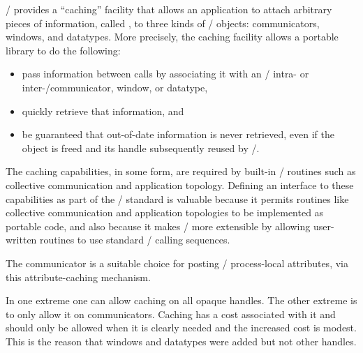 \MPI/ provides a ``caching'' facility that allows an application to
attach arbitrary pieces of information, called , to
three kinds of \MPI/ objects: communicators,
windows, and datatypes.
More precisely, the caching
facility allows a portable library to do the following:
\begin{itemize}
\item
  pass information between calls by associating it
  with an \MPI/ intra- or inter\hyphen/communicator,
window, or datatype,
\item quickly retrieve that information, and
\item
 be guaranteed that out-of-date information is never retrieved, even if
 the object is freed and its handle subsequently reused by \MPI/.
\end{itemize}

The caching capabilities, in some form, are required by built-in \MPI/ routines
such as collective communication and application topology. Defining an
interface to these capabilities as part of the \MPI/ standard is valuable
because it permits routines like collective communication and application
topologies to be implemented as portable code, and also because it makes \MPI/
more extensible by allowing user-written routines to use standard \MPI/ calling
sequences.

\begin{users}
The communicator  is a suitable choice for posting
\MPI/ process-local attributes, via this
attribute-caching mechanism.
\end{users}


\begin{rationale}
In one extreme 
one
can allow caching on all opaque handles. The other
extreme is to only allow it on communicators. Caching has a cost
associated with it and should only be allowed when it is clearly needed and
the increased cost is modest.
This is the reason that windows and datatypes were
added but not other handles.
\end{rationale}

